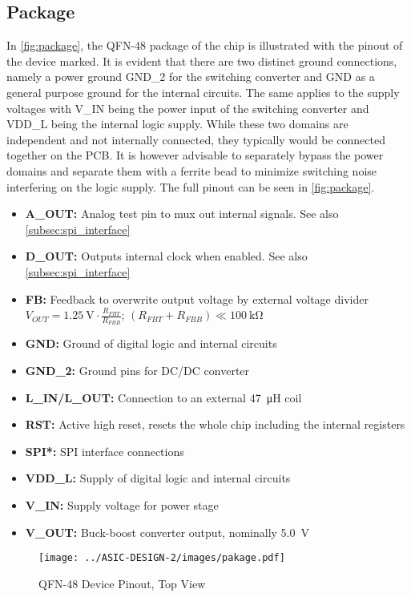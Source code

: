 \subsection{Package}
In \autoref{fig:package}, the QFN-48 package of the chip is illustrated with the pinout of the device marked. It is evident that there are two distinct ground connections, namely a power ground GND\_2 for the switching converter and GND as a general purpose ground for the internal circuits. The same applies to the supply voltages with V\_IN being the power input of the switching converter and VDD\_L being the internal logic supply. While these two domains are independent and not internally connected, they typically would be connected together on the \ac{PCB}. It is however advisable to separately bypass the power domains and separate them with a ferrite bead to minimize switching noise interfering on the logic supply. The full pinout can be seen in \autoref{fig:package}.
\begin{itemize}
	\item \textbf{A\_OUT:} Analog test pin to mux out internal signals. See also \autoref{subsec:spi_interface}
	\item \textbf{D\_OUT:} Outputs internal clock when enabled. See also \autoref{subsec:spi_interface}
	\item \textbf{FB:} Feedback to overwrite output voltage by external voltage divider \\
            $V_{OUT} = \qty{1.25}{\volt} \cdot \frac{R_{FBT}}{R_{FBB}}$; $(R_{FBT}+R_{FBB}) \ll \qty{100}{\kilo\ohm}$
	\item \textbf{GND:} Ground of digital logic and internal circuits
	\item \textbf{GND\_2:} Ground pins for DC/DC converter
	\item \textbf{L\_IN/L\_OUT:} Connection to an external \qty{47}{\micro\henry} coil
	\item \textbf{RST:} Active high reset, resets the whole chip including the internal registers
	\item \textbf{SPI*:} SPI interface connections
	\item \textbf{VDD\_L:} Supply of digital logic and internal circuits
	\item \textbf{V\_IN:} Supply voltage for power stage
	\item \textbf{V\_OUT:} Buck-boost converter output, nominally \qty{5.0}{\volt}
\end{itemize}
\begin{figure}[h]
	\centering
	\texttt{[image: ../ASIC-DESIGN-2/images/pakage.pdf]}
	\caption{QFN-48 Device Pinout, Top View}
	\label{fig:package}
\end{figure}
